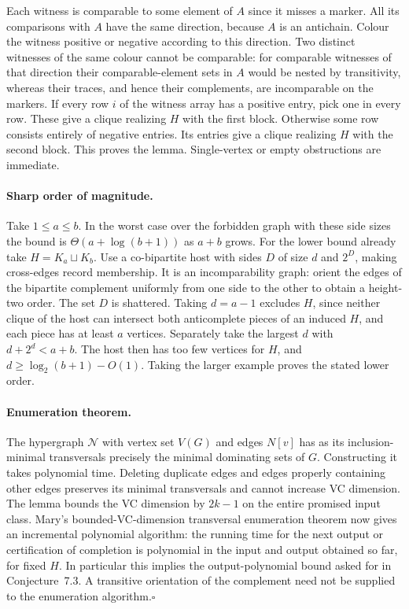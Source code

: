 \documentclass[11pt]{article}
\begin{document}
Each witness is comparable to some element of $A$ since it misses a marker. All its comparisons with $A$ have the same direction, because $A$ is an antichain. Colour the witness positive or negative according to this direction. Two distinct witnesses of the same colour cannot be comparable: for comparable witnesses of that direction their comparable-element sets in $A$ would be nested by transitivity, whereas their traces, and hence their complements, are incomparable on the markers. If every row $i$ of the witness array has a positive entry, pick one in every row. These give a clique realizing $H$ with the first block. Otherwise some row consists entirely of negative entries. Its entries give a clique realizing $H$ with the second block. This proves the lemma. Single-vertex or empty obstructions are immediate.

\paragraph{Sharp order of magnitude.} Take $1\le a\le b$. In the worst case over the forbidden graph with these side sizes the bound is $\Theta(a+\log(b+1))$ as $a+b$ grows. For the lower bound already take $H=K_a\sqcup K_b$. Use a co-bipartite host with sides $D$ of size $d$ and $2^D$, making cross-edges record membership. It is an incomparability graph: orient the edges of the bipartite complement uniformly from one side to the other to obtain a height-two order. The set $D$ is shattered. Taking $d=a-1$ excludes $H$, since neither clique of the host can intersect both anticomplete pieces of an induced $H$, and each piece has at least $a$ vertices. Separately take the largest $d$ with $d+2^d<a+b$. The host then has too few vertices for $H$, and $d\ge \log_2(b+1)-O(1)$. Taking the larger example proves the stated lower order.

\paragraph{Enumeration theorem.} The hypergraph $\mathcal N$ with vertex set $V(G)$ and edges $N[v]$ has as its inclusion-minimal transversals precisely the minimal dominating sets of $G$. Constructing it takes polynomial time. Deleting duplicate edges and edges properly containing other edges preserves its minimal transversals and cannot increase VC dimension. The lemma bounds the VC dimension by $2k-1$ on the entire promised input class. Mary's bounded-VC-dimension transversal enumeration theorem now gives an incremental polynomial algorithm: the running time for the next output or certification of completion is polynomial in the input and output obtained so far, for fixed $H$. In particular this implies the output-polynomial bound asked for in Conjecture~7.3. A transitive orientation of the complement need not be supplied to the enumeration algorithm.\hfill$\square$
\end{document}
